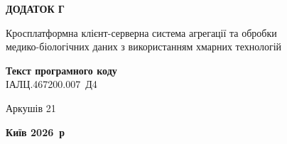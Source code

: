 \documentclass[%
  ukrainian, utf8, columnvii, simple,
  hpadding=10mm, vpadding=10mm, reduceheight=2mm,
  floatsection,
]{eskdtext}
\begin{document}
\thispagestyle{empty}
\begin{center}
\vspace*{3cm}
{\large\textbf{ДОДАТОК Г}}

\vspace{1.5cm}
{\normalsize Кросплатформна клієнт-серверна система агрегації та обробки\\
медико-біологічних даних з використанням хмарних технологій}

\vfill
{\large\textbf{Текст програмного коду}}\\[0.6em]
{\normalsize ІАЛЦ.467200.007~Д4}

\vspace{2.5cm}
{\normalsize Аркушів 21}

\vfill
{\large\textbf{Київ 2026~р}}
\end{center}
\clearpage
{}

\setcounter{page}{1}
\end{document}
